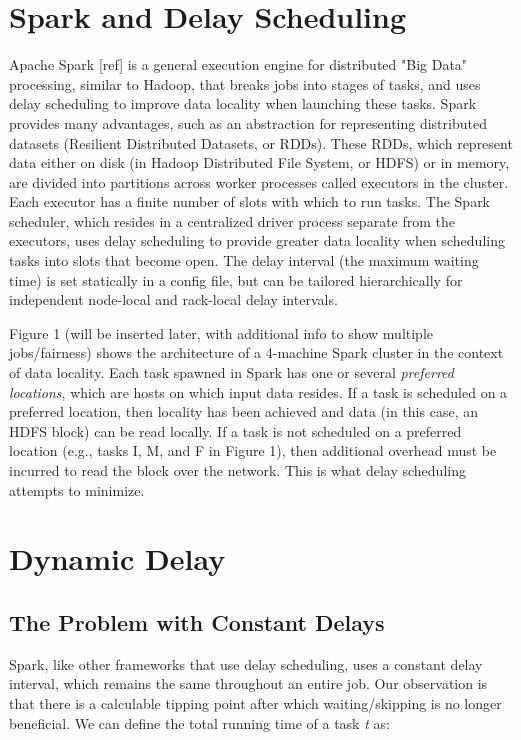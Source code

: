 \documentclass[10pt,conference,compsocconf,letterpaper]{IEEEtran}
\begin{document}
\section{Spark and Delay Scheduling}\label{sec:spark}

Apache Spark [ref] is a general execution engine for distributed "Big Data" processing, 
similar to Hadoop, that breaks jobs into stages of tasks, and uses delay scheduling to 
improve data locality when launching these tasks. Spark provides many advantages, such 
as an abstraction for representing distributed datasets (Resilient Distributed Datasets, 
or RDDs). These RDDs, which represent data either on disk (in Hadoop Distributed File 
System, or HDFS) or in memory, are divided into partitions across worker processes called 
executors in the cluster. Each executor has a finite number of slots with which to run 
tasks. The Spark scheduler, which resides in a centralized driver process separate from 
the executors, uses delay scheduling to provide greater data locality when scheduling 
tasks into slots that become open. The delay interval (the maximum waiting time) is set 
statically in a config file, but can be tailored hierarchically for independent 
node-local and rack-local delay intervals.

Figure 1 (will be inserted later, with additional info to show multiple jobs/fairness) 
shows the architecture of a 4-machine Spark cluster in the context of data locality. Each 
task spawned in Spark has one or several \textit{preferred locations}, which are hosts on 
which input data resides. If a task is scheduled on a preferred location, then locality 
has been achieved and data (in this case, an HDFS block) can be read locally. If a task 
is not scheduled on a preferred location (e.g., tasks I, M, and F in Figure 1), then 
additional overhead must be incurred to read the block over the network. This is what 
delay scheduling attempts to minimize.


\section{Dynamic Delay}\label{sec:dynamic}

\subsection{The Problem with Constant Delays}

Spark, like other frameworks that use delay scheduling, uses a constant delay interval, 
which remains the same throughout an entire job. Our observation is that there is a 
calculable tipping point after which waiting/skipping is no longer beneficial. We can 
define the total running time of a task \textit{t} as: \newline
\end{document}

